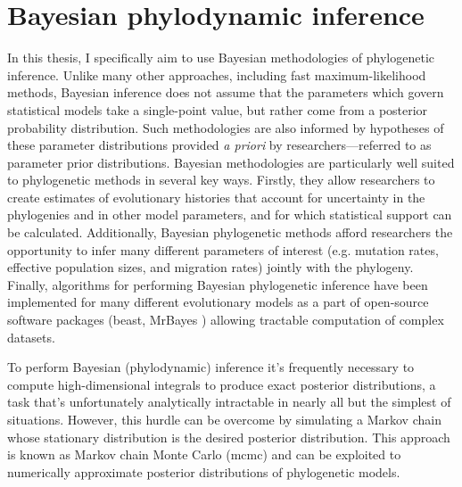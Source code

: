 \section{Bayesian phylodynamic inference}

In this thesis, I specifically aim to use Bayesian methodologies of phylogenetic inference.
Unlike many other approaches, including fast maximum-likelihood methods, Bayesian inference does not assume that the parameters which govern statistical models take a single-point value, but rather come from a posterior probability distribution.
Such methodologies are also informed by hypotheses of these parameter distributions provided \textit{a priori} by researchers---referred to as parameter prior distributions.
Bayesian methodologies are particularly well suited to phylogenetic methods in several key ways.
Firstly, they allow researchers to create estimates of evolutionary histories that account for uncertainty in the phylogenies and in other model parameters, and for which statistical support can be calculated.
Additionally, Bayesian phylogenetic methods afford researchers the opportunity to infer many different parameters of interest (e.g. mutation rates, effective population sizes, and migration rates) jointly with the phylogeny.
Finally, algorithms for performing Bayesian phylogenetic inference have been implemented for many different evolutionary models as a part of open-source software packages (\gls{beast}, MrBayes \cite{huelsenbeck2001mrbayes}) allowing tractable computation of complex datasets. %

To perform Bayesian (phylodynamic) inference it's frequently necessary to compute high-dimensional integrals to produce exact posterior distributions, a task that's unfortunately analytically intractable in nearly all but the simplest of situations.
However, this hurdle can be overcome by simulating a Markov chain whose stationary distribution is the desired posterior distribution.
This approach is known as Markov chain Monte Carlo (\gls{mcmc}) and can be exploited to numerically approximate posterior distributions of phylogenetic models.

